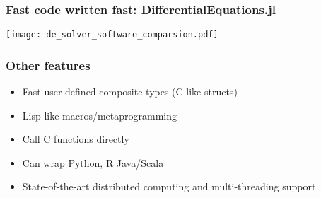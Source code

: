 \documentclass[t]{beamer}
\newcommand\df{\bf\color{Maroon}}
\begin{document}


\begin{frame}[plain]
  \frametitle{Fast code written fast: DifferentialEquations.jl}
     \texttt{[image: de\_solver\_software\_comparsion.pdf]}
\end{frame}

% 





\begin{frame}
  \frametitle{Other features}
  \begin{itemize}
    \item Fast user-defined composite types (C-like structs)
    \item Lisp-like macros/metaprogramming
    \item Call C functions directly
    \item Can wrap Python, R Java/Scala
    \item State-of-the-art distributed computing and multi-threading support
  \end{itemize}
\end{frame}
\end{document}
